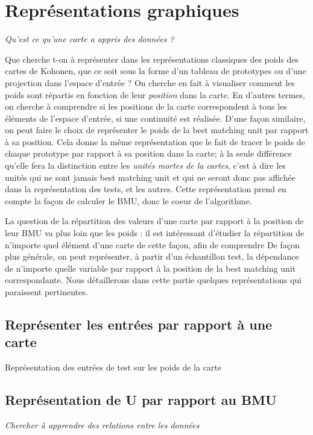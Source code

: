 \section{Représentations graphiques}

\emph{Qu'est ce qu'une carte a appris des données ?}

Que cherche t-on à représenter dans les représentations classiques des poids des cartes de Kohonen, que ce soit sous la forme d'un tableau de prototypes ou d'une projection dans l'espace d'entrée ? On cherche en fait à visualiser comment les poids sont répartis en fonction de leur \emph{position} dans la carte. En d'autres termes, on cherche à comprendre si les positions de la carte correspondent à tous les éléments de l'espace d'entrée, si une continuité est réalisée. 
D'une façon similaire, on peut faire le choix de représenter le poids de la best matching unit par rapport à sa position. Cela donne la même représentation que le fait de tracer le poids de chaque prototype par rapport à sa position dans la carte; à la seule différence qu'elle fera la distinction entre les \emph{unités mortes de la cartes}, c'est à dire les unités qui ne sont jamais best matching unit et qui ne seront donc pas affichée dans la représentation des tests, et les autres.
Cette représentation prend en compte la façon de calculer le BMU, donc le coeur de l'algorithme.

La question de la répartition des valeurs d'une carte par rapport à la position de leur BMU va plus loin que les poids : il est intéressant d'étudier la répartition de n'importe quel élément d'une carte de cette façon, afin de comprendre 
De façon plus générale, on peut représenter, à partir d'un échantillon test, la dépendance de n'importe quelle variable par rapport à la position de la best matching unit correspondante. Nous détaillerons dans cette partie quelques représentations qui paraissent pertinentes.


\subsection{Représenter les entrées par rapport à une carte}

Représentation des entrées de test sur les poids de la carte

\subsection{Représentation de U par rapport au BMU}
\emph{Chercher à apprendre des relations entre les données}

